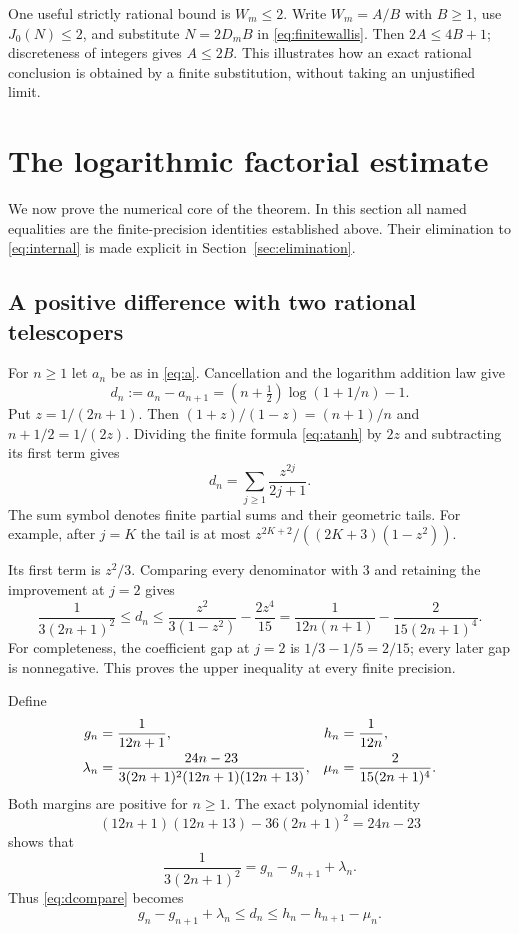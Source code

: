 \documentclass[11pt]{article}
\theoremstyle{definition}
\newcommand{\lmargin}{\lambda}
\newcommand{\umargin}{\mu}
\begin{document}
One useful strictly rational bound is $W_m\le2$. Write $W_m=A/B$
with $B\ge1$, use $J_0(N)\le2$, and substitute $N=2D_mB$ in
\eqref{eq:finitewallis}. Then $2A\le4B+1$; discreteness of
integers gives $A\le2B$. This illustrates how an exact rational
conclusion is obtained by a finite substitution, without taking an
unjustified limit.

\section{The logarithmic factorial estimate}
\label{sec:factorial}

We now prove the numerical core of the theorem. In this section all named
equalities are the finite-precision identities established above. Their
elimination to \eqref{eq:internal} is made explicit in
Section~\ref{sec:elimination}.

\subsection{A positive difference with two rational telescopers}

For $n\ge1$ let $a_n$ be as in \eqref{eq:a}. Cancellation and the
logarithm addition law give
\begin{equation}\label{eq:d}
 d_n:=a_n-a_{n+1}
 =\left(n+\tfrac12\right)\log(1+1/n)-1.
\end{equation}
Put $z=1/(2n+1)$. Then $(1+z)/(1-z)=(n+1)/n$ and
$n+1/2=1/(2z)$. Dividing the finite formula \eqref{eq:atanh} by
$2z$ and subtracting its first term gives
\begin{equation}\label{eq:dseries}
 d_n=\sum_{j\ge1}\frac{z^{2j}}{2j+1}.
\end{equation}
The sum symbol denotes finite partial sums and their geometric tails.
For example, after $j=K$ the tail is at most
$z^{2K+2}/((2K+3)(1-z^2))$.

Its first term is $z^2/3$. Comparing every denominator with $3$ and
retaining the improvement at $j=2$ gives
\begin{equation}\label{eq:dcompare}
 \frac1{3(2n+1)^2}\le d_n
 \le\frac{z^2}{3(1-z^2)}-\frac{2z^4}{15}
 =\frac1{12n(n+1)}-\frac{2}{15(2n+1)^4}.
\end{equation}
For completeness, the coefficient gap at $j=2$ is
$1/3-1/5=2/15$; every later gap is nonnegative. This proves the
upper inequality at every finite precision.

Define
\begin{align}
 g_n&=\frac1{12n+1},& h_n&=\frac1{12n},\notag\\
 \lmargin_n&=\frac{24n-23}{3(2n+1)^2(12n+1)(12n+13)},&
 \umargin_n&=\frac{2}{15(2n+1)^4}.\label{eq:margins}
\end{align}
Both margins are positive for $n\ge1$. The exact polynomial identity
\[
 (12n+1)(12n+13)-36(2n+1)^2=24n-23
\]
shows that
\[
 \frac1{3(2n+1)^2}=g_n-g_{n+1}+\lmargin_n.
\]
Thus \eqref{eq:dcompare} becomes
\begin{equation}\label{eq:telescopers}
 g_n-g_{n+1}+\lmargin_n\le d_n
 \le h_n-h_{n+1}-\umargin_n.
\end{equation}
\end{document}
